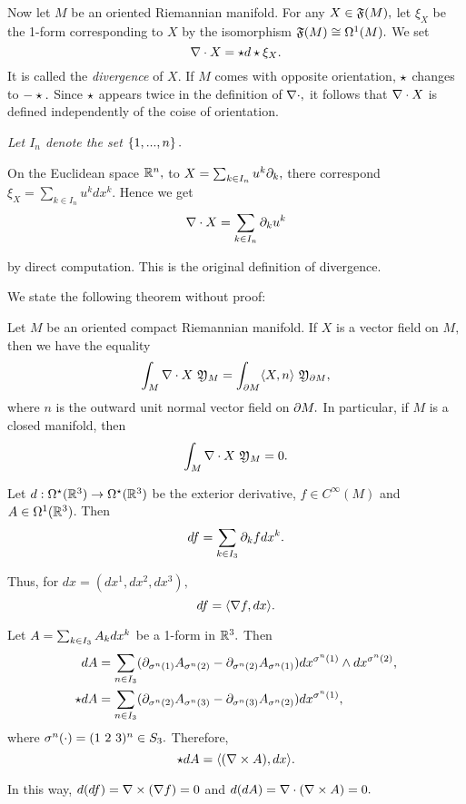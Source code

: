 Now let $M$ be an oriented Riemannian manifold. For any $X \in \mathfrak{F}(M),$ let $\xi_{X}$ be the 1-form corresponding
to $X$ by the isomorphism $\mathfrak{F}(M) \cong \Omega^{1}(M).$ We set
$$
\nabla \cdot X = \star d \star \xi_{X}.
$$
It is called the \emph{divergence} of $X$. If $M$ comes with opposite orientation, $\star$ changes to $-\star.$ Since
$\star$ appears twice in the definition of $\nabla \cdot,$ it follows that $\nabla \cdot X$ is defined independently of the coise of
orientation.

\emph{Let $I_{n}$ denote the set $\left\{ 1,...,n \right\}.$}

\begin{exmp}
 \label{SM:4.8}
On the Euclidean space $\mathbb R^{n},$ to $X=\sum_{k \in I_{n}}u^{k}\partial_{k},$ there correspond
$\xi_{X}=\sum_{k \in I_{n}}u^{k}dx^{k}.$ Hence we
get
\begin{equation}
\label{SA:3.28}
 \nabla \cdot X = \sum_{k \in I_{n}} \partial_{k}u^{k}
\end{equation}

by direct computation. This is the original definition of divergence.
\end{exmp}

We state the following theorem without proof:

\begin{thm}[\cite{SM}, 4.9]
 Let $M$ be an oriented compact Riemannian manifold. If $X$ is a vector field on $M,$ then we have the equality
$$
\int_{M} \dvg X \ \mfk{Y}_{M} = \int_{\p M} \inp{X}{n} \ \mfk{Y}_{\p M},
$$
where $n$ is the outward unit normal vector field on $\partial M.$ In particular, if $M$ is a closed manifold, then
$$
\int_{M} \nabla \cdot X \ \mathfrak{Y}_{M} = 0.
$$
\end{thm}

\begin{rem}
 Let $d:\Omega^{\star}(\mathbb R^{3}) \to \Omega^{\star}(\mathbb R^{3})$ be the exterior derivative, $f\in C^{\infty}(M)$ and $A\in
\Omega^{1}(\mathbb R^{3})$. Then
\begin{equation}
 \label{SA:3.24}
df=\sum_{k \in I_{3}} \partial_{k}f dx^{k}.
\end{equation}

Thus, for $dx=(dx^{1}, dx^{2}, dx^{3}),$
\begin{equation}
 \label{SA:3.25}
df=\langle \nabla f, dx\rangle.
\end{equation}

Let $A=\sum_{k \in I_{3}}A_{k}dx^{k}$ be a 1-form in $\mathbb R^{3}.$ Then
\begin{equation}
 \label{SA:3.26}
\begin{split}
 dA &= \sum_{n \in I_{3}} (\partial_{\sigma^{n}(1)}A_{\sigma^{n}(2)}-\partial_{\sigma^{n}(2)}A_{\sigma^{n}(1)})dx^{\sigma^{n}(1)}\wedge dx^{\sigma^{n}(2)}, \\
\star d A &= \sum_{n \in I_{3}} (\partial_{\sigma^{n}(2)}A_{\sigma^{n}(3)}-\partial_{\sigma^{n}(3)}A_{\sigma^{n}(2)})dx^{\sigma^{n}(1)},
\end{split}
\end{equation}
where $\sigma^{n}(\cdot)=(1 \ 2 \ 3)^{n}\in S_{3}.$ Therefore,
\begin{equation}
 \label{SA:3.27}
\star d A=\langle (\nabla \times A), dx\rangle.
\end{equation}

In this way, $d(df)= \nabla \times(\nabla f)=0$ and $d(dA)=\nabla \cdot(\nabla \times A)=0.$
\end{rem}

